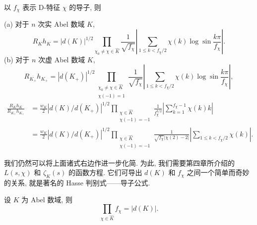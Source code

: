 \begin{lemma}\label{lem:ch6-6}
以 $f_\chi$ 表示 D-特征 $\chi$ 的导子, 则

(a) 对于 $n$ 次实 Abel 数域 $K$,
\[
  R_Kh_K=|d(K)|^{1/2}\prod_{\chi_0\neq\chi\in\widehat{K}}\frac{1}{\sqrt{f_\chi}}\left|\sum_{1\leqslant k<f_\chi/2}\chi(k)\log\sin\frac{k\pi}{f_\chi}\right|.
\]
(b) 对于 $n$ 次虚 Abel 数域 $K$,
\[
  R_{K_+}h_{K_+}=|d(K_+)|^{1/2}\prod_{\substack{\chi_0\neq\chi\in\widehat{K}\\ \chi(-1)=1}}\frac{1}{\sqrt{f_\chi}}\left|\sum_{1\leqslant k<f_\chi/2}\chi(k)\log\sin\frac{k\pi}{f_\chi}\right|,
\]
\[
  \begin{aligned}
    \frac{R_Kh_K}{R_{K_+}h_{K_+}}&=\frac{w_K}{2}|d(K)/d(K_+)|^{1/2}\prod_{\substack{\chi\in\widehat{K}\\ \chi(-1)=-1}}\frac{1}{f_\chi^{3/2}}\left|\sum_{k=1}^{f_\chi-1}\chi(k)k\right|\\
    &=\frac{w_K}{2}|d(K)/d(K_+)|^{1/2}\prod_{\substack{\chi\in\widehat{K}\\ \chi(-1)=-1}}\frac{1}{\sqrt{f_\chi}|\chi(2)-2|}\left|\sum_{1\leqslant k<f_\chi/2}\chi(k)\right|.
  \end{aligned}
\]
\end{lemma}

我们仍然可以将上面诸式右边作进一步化简. 为此, 我们需要第四章所介绍的 $L(s,\chi)$ 和 $\zeta_K(s)$ 的函数方程. 它们可导出 $d(K)$ 和 $f_\chi$ 之间一个简单而奇妙的关系, 就是著名的 Hasse 判别式——导子公式.

\begin{lemma}\label{lem:ch6-7}
设 $K$ 为 Abel 数域, 则
\[
  \prod_{\chi\in\widehat{K}}f_\chi=|d(K)|.
\]
\end{lemma}

